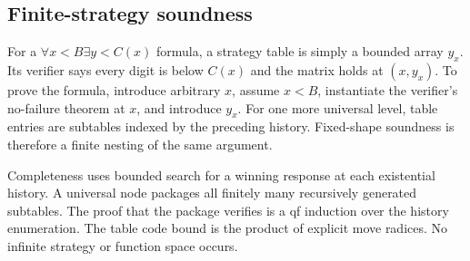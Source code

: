 \subsection{Finite-strategy soundness}

For a \(\forall x<B\exists y<C(x)\) formula, a strategy table is simply a
bounded array \(y_x\).  Its verifier says every digit is below \(C(x)\) and
the matrix holds at \((x,y_x)\).  To prove the formula, introduce arbitrary
\(x\), assume \(x<B\), instantiate the verifier's no-failure theorem at \(x\),
and introduce \(y_x\).  For one more universal level, table entries are
subtables indexed by the preceding history.  Fixed-shape soundness is therefore
a finite nesting of the same argument.

Completeness uses bounded search for a winning response at each existential
history.  A universal node packages all finitely many recursively generated
subtables.  The proof that the package verifies is a qf induction over the
history enumeration.  The table code bound is the product of explicit move
radices.  No infinite strategy or function space occurs.
